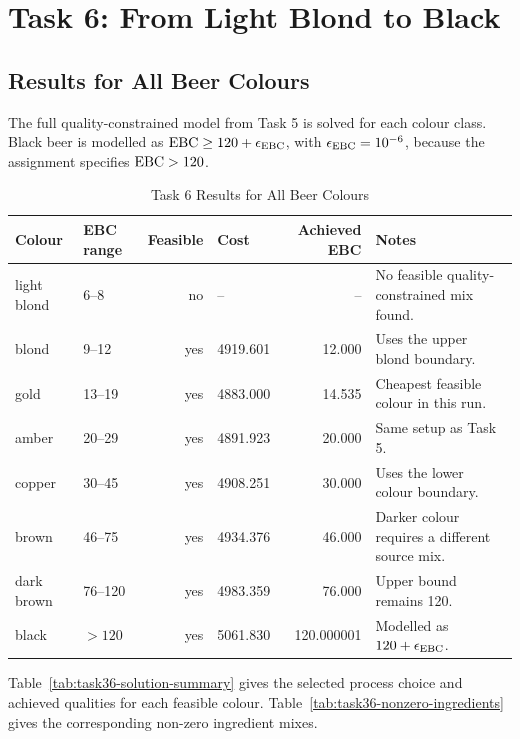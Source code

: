 \section{Task 6: From Light Blond to Black}
\label{sec:task6}

\subsection{Results for All Beer Colours}
\label{sec:task6-results}
The full quality-constrained model from Task 5 is solved for each colour class. Black beer is modelled as $\mathrm{EBC} \geq 120+\epsilon_{\mathrm{EBC}}$, with $\epsilon_{\mathrm{EBC}}=10^{-6}$, because the assignment specifies $\mathrm{EBC}>120$.

\begin{table}[H]
\renewcommand{\arraystretch}{1.15}
\caption{Task 6 Results for All Beer Colours}
\label{tab:task36-colors}
\centering
\small
\begin{tabular}{@{}llrlrp{}@{}}
\toprule
Colour & EBC range & Feasible & Cost & Achieved EBC & Notes \\
\midrule
light blond & 6--8 & no & -- & -- & No feasible quality-constrained mix found. \\
blond & 9--12 & yes & 4919.601 & 12.000 & Uses the upper blond boundary. \\
gold & 13--19 & yes & 4883.000 & 14.535 & Cheapest feasible colour in this run. \\
amber & 20--29 & yes & 4891.923 & 20.000 & Same setup as Task 5. \\
copper & 30--45 & yes & 4908.251 & 30.000 & Uses the lower colour boundary. \\
brown & 46--75 & yes & 4934.376 & 46.000 & Darker colour requires a different source mix. \\
dark brown & 76--120 & yes & 4983.359 & 76.000 & Upper bound remains 120. \\
black & $>120$ & yes & 5061.830 & 120.000001 & Modelled as $120+\epsilon_{\mathrm{EBC}}$. \\
\bottomrule
\end{tabular}
\end{table}

Table~\ref{tab:task36-solution-summary} gives the selected process choice and achieved qualities for each feasible colour. Table~\ref{tab:task36-nonzero-ingredients} gives the corresponding non-zero ingredient mixes.



